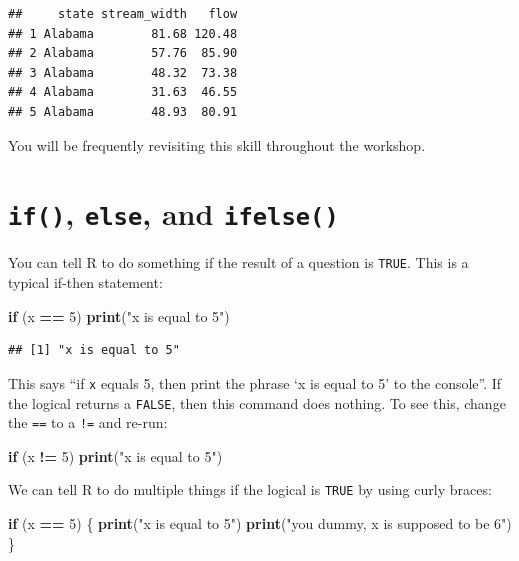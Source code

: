\documentclass[]{book}
\newenvironment{Shaded}{\begin{snugshade}}{\end{snugshade}}
\newcommand{\KeywordTok}[1]{\textcolor[rgb]{0.13,0.29,0.53}{\textbf{#1}}}
\newcommand{\DecValTok}[1]{\textcolor[rgb]{0.00,0.00,0.81}{#1}}
\newcommand{\StringTok}[1]{\textcolor[rgb]{0.31,0.60,0.02}{#1}}
\newcommand{\ControlFlowTok}[1]{\textcolor[rgb]{0.13,0.29,0.53}{\textbf{#1}}}
\newcommand{\OperatorTok}[1]{\textcolor[rgb]{0.81,0.36,0.00}{\textbf{#1}}}
\newcommand{\NormalTok}[1]{#1}
\theoremstyle{definition}
\theoremstyle{definition}
\theoremstyle{definition}
\theoremstyle{remark}
\begin{document}
\begin{verbatim}
##     state stream_width   flow
## 1 Alabama        81.68 120.48
## 2 Alabama        57.76  85.90
## 3 Alabama        48.32  73.38
## 4 Alabama        31.63  46.55
## 5 Alabama        48.93  80.91
\end{verbatim}

You will be frequently revisiting this skill throughout the workshop.

\section{\texorpdfstring{\texttt{if()}, \texttt{else}, and
\texttt{ifelse()}}{if(), else, and ifelse()}}\label{if-else-and-ifelse}

You can tell R to do something if the result of a question is
\texttt{TRUE}. This is a typical if-then statement:

\begin{Shaded}
\begin{Highlighting}[]
\ControlFlowTok{if}\NormalTok{ (x }\OperatorTok{==}\StringTok{ }\DecValTok{5}\NormalTok{) }\KeywordTok{print}\NormalTok{(}\StringTok{"x is equal to 5"}\NormalTok{)}
\end{Highlighting}
\end{Shaded}

\begin{verbatim}
## [1] "x is equal to 5"
\end{verbatim}

This says ``if \texttt{x} equals 5, then print the phrase `x is equal to
5' to the console''. If the logical returns a \texttt{FALSE}, then this
command does nothing. To see this, change the \texttt{==} to a
\texttt{!=} and re-run:

\begin{Shaded}
\begin{Highlighting}[]
\ControlFlowTok{if}\NormalTok{ (x }\OperatorTok{!=}\StringTok{ }\DecValTok{5}\NormalTok{) }\KeywordTok{print}\NormalTok{(}\StringTok{"x is equal to 5"}\NormalTok{)}
\end{Highlighting}
\end{Shaded}

We can tell R to do multiple things if the logical is \texttt{TRUE} by
using curly braces:

\begin{Shaded}
\begin{Highlighting}[]
\ControlFlowTok{if}\NormalTok{ (x }\OperatorTok{==}\StringTok{ }\DecValTok{5}\NormalTok{) \{}
  \KeywordTok{print}\NormalTok{(}\StringTok{"x is equal to 5"}\NormalTok{)}
  \KeywordTok{print}\NormalTok{(}\StringTok{"you dummy, x is supposed to be 6"}\NormalTok{)}
\NormalTok{\}}
\end{Highlighting}
\end{Shaded}
\end{document}
